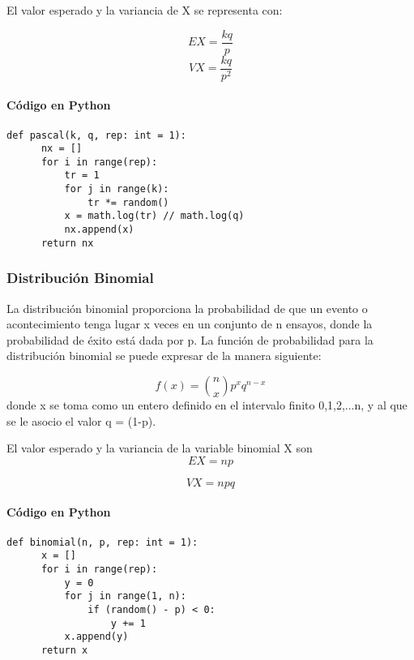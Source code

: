 \documentclass{article}
\begin{document}
  El valor esperado y la variancia de X se representa con:

  \begin{equation}
    EX = \frac{kq}{p}
  \end{equation}
  \begin{equation}
    VX = \frac{kq}{p^2}
  \end{equation}

  \paragraph{Código en Python}
  \begin{lstlisting}[style = Python]
    def pascal(k, q, rep: int = 1):
      nx = []
      for i in range(rep):
          tr = 1
          for j in range(k):
              tr *= random()
          x = math.log(tr) // math.log(q)
          nx.append(x)
      return nx
  \end{lstlisting}

  \subsubsection{Distribución Binomial}
  La distribución binomial proporciona la probabilidad de que un evento o acontecimiento tenga lugar x veces en un conjunto de n ensayos,
  donde la probabilidad de éxito está dada por p. La función de probabilidad para la distribución binomial se puede expresar de la manera siguiente:

  \begin{equation}
    f(x) = \binom{n}{x} p^{x}q^{n-x}
  \end{equation}
  donde x se toma como un entero definido en el intervalo finito 0,1,2,...n, y al que se le asocio el valor q = (1-p).

  El valor esperado y la variancia de la variable binomial X son
  \begin{equation}
    EX = np
  \end{equation}

  \begin{equation}
  VX = npq
  \end{equation}

  \paragraph{Código en Python}
  \begin{lstlisting}[style = Python]
   def binomial(n, p, rep: int = 1):
      x = []
      for i in range(rep):
          y = 0
          for j in range(1, n):
              if (random() - p) < 0:
                  y += 1
          x.append(y)
      return x
  \end{lstlisting}
\end{document}
